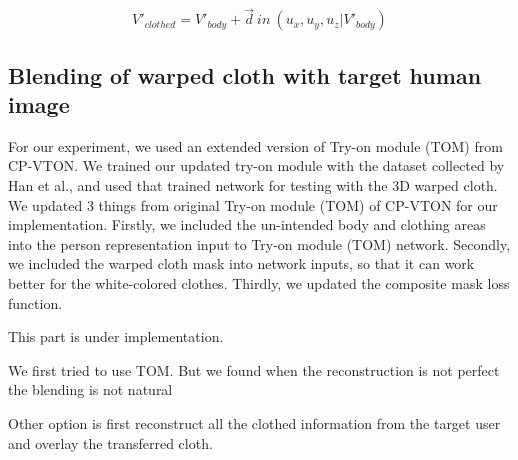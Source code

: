\begin{equation}
 V'_{clothed} = V'_{body} + \overrightarrow{d} \: in \: (u_x, u_y, u_z | V'_{body})
\end{equation}



\subsection{Blending of warped cloth with target human image}

For our experiment, we used an extended version of Try-on module (TOM) from CP-VTON\cite{Wang2018TowardCI}. We trained  our updated try-on module with the dataset collected by Han et al.\cite{Han2017VITONAI}, and used that trained network for testing with the 3D warped cloth. We updated 3 things from original Try-on module (TOM) of CP-VTON\cite{Wang2018TowardCI} for our implementation. Firstly, we included the un-intended body and clothing areas into the person representation input to Try-on module (TOM) network\cite{Wang2018TowardCI}. Secondly, we included the warped cloth mask into network inputs, so that it can work better for the white-colored clothes. Thirdly, we updated the composite mask loss function\cite{Wang2018TowardCI}.


This part is under implementation.

We first tried to use TOM. But we found when the reconstruction is not perfect the blending is not natural 

Other option is first reconstruct all the clothed information from the target user and overlay the transferred cloth.






